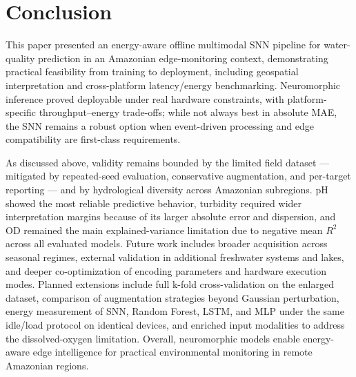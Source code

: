 \section{Conclusion}

This paper presented an energy-aware offline multimodal SNN pipeline for water-quality prediction in an Amazonian edge-monitoring context, demonstrating practical feasibility from training to deployment, including geospatial interpretation and cross-platform latency/energy benchmarking. Neuromorphic inference proved deployable under real hardware constraints, with platform-specific throughput--energy trade-offs; while not always best in absolute MAE, the SNN remains a robust option when event-driven processing and edge compatibility are first-class requirements.

As discussed above, validity remains bounded by the limited field dataset --- mitigated by repeated-seed evaluation, conservative augmentation, and per-target reporting --- and by hydrological diversity across Amazonian subregions. pH showed the most reliable predictive behavior, turbidity required wider interpretation margins because of its larger absolute error and dispersion, and OD remained the main explained-variance limitation due to negative mean $R^2$ across all evaluated models. Future work includes broader acquisition across seasonal regimes, external validation in additional freshwater systems and lakes, and deeper co-optimization of encoding parameters and hardware execution modes. Planned extensions include full k-fold cross-validation on the enlarged dataset, comparison of augmentation strategies beyond Gaussian perturbation, energy measurement of SNN, Random Forest, LSTM, and MLP under the same idle/load protocol on identical devices, and enriched input modalities to address the dissolved-oxygen limitation. Overall, neuromorphic models enable energy-aware edge intelligence for practical environmental monitoring in remote Amazonian regions.
